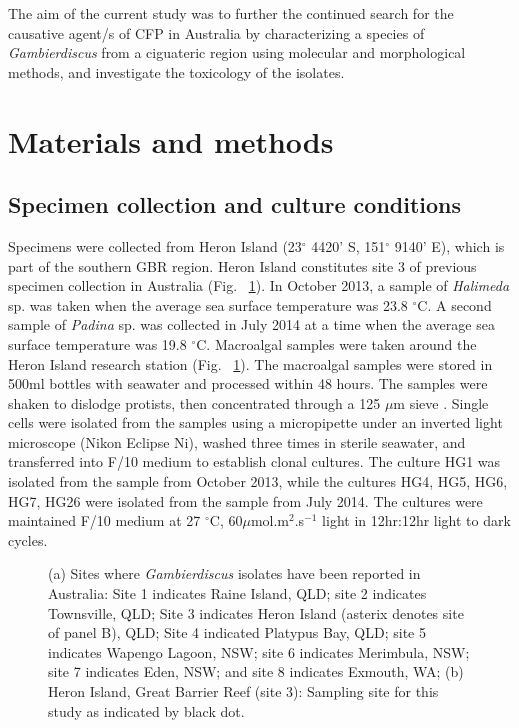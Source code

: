 \documentclass[12pt]{article}
\begin{document}
The aim of the current study was to further the continued search for the causative agent/s of CFP in Australia by characterizing a species of \emph{Gambierdiscus} from a ciguateric region using molecular and morphological methods, and investigate the toxicology of the isolates.

 \newpage
\section{Materials and methods}

\subsection{Specimen collection and culture conditions}
\floatbarrier
Specimens were collected from Heron Island (23$^{\circ}$ 4420' S, 151$^{\circ}$ 9140' E), which is part of the southern GBR region. 
Heron Island constitutes site 3 of previous specimen collection in Australia (Fig. ~\ref{fig:OzSites}).
In October 2013, a sample of \emph{Halimeda} sp. was taken when the average sea surface temperature was 23.8 $^{\circ}$C. 
A second sample of \emph{Padina} sp. was collected in July 2014 at a time when the average sea surface temperature was 19.8 $^{\circ}$C.
Macroalgal samples were taken around the Heron Island research station (Fig. ~\ref{fig:OzSites}). 
The macroalgal samples were stored in 500ml bottles with seawater and processed within 48 hours. 
The samples were shaken to dislodge protists, then concentrated through a 125 $\mu$m sieve \citep{litaker2010global}. 
Single cells were isolated from the samples using a micropipette under an inverted light microscope (Nikon Eclipse Ni), washed three times in sterile seawater, and transferred into F/10 medium \citep{holmes1991strain} to establish clonal cultures.
The culture HG1 was isolated from the sample from October 2013, while the cultures HG4, HG5, HG6, HG7, HG26 were isolated from the sample from July 2014.
The cultures were maintained F/10 medium at 27 $^{\circ}$C, 60$\mu$mol.m$^{2}$.s$^{-1}$ light in 12hr:12hr light to dark cycles.

\begin{figure} 
\caption{(a) Sites where \textit{Gambierdiscus} isolates have been reported in Australia: Site 1 indicates Raine Island, QLD; site 2 indicates Townsville, QLD; Site 3 indicates Heron Island (asterix denotes site of panel B), QLD; Site 4 indicated Platypus Bay, QLD; site 5 indicates Wapengo Lagoon, NSW; site 6 indicates Merimbula, NSW; site 7 indicates Eden, NSW; and site 8 indicates Exmouth, WA; (b) Heron Island, Great Barrier Reef (site 3): Sampling site for this study as indicated by black dot.} 
\label{fig:OzSites}
\end{figure}
\end{document}
